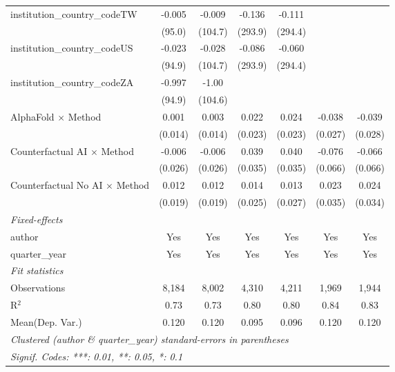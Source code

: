 \begin{tabular}{lcccccc}
   institution\_country\_codeTW          & -0.005        & -0.009        & -0.136        & -0.111        &               &   \\   
                                         & (95.0)        & (104.7)       & (293.9)       & (294.4)       &               &   \\   
   institution\_country\_codeUS          & -0.023        & -0.028        & -0.086        & -0.060        &               &   \\   
                                         & (94.9)        & (104.7)       & (293.9)       & (294.4)       &               &   \\   
   institution\_country\_codeZA          & -0.997        & -1.00         &               &               &               &   \\   
                                         & (94.9)        & (104.6)       &               &               &               &   \\   
   AlphaFold $\times$ Method             & 0.001         & 0.003         & 0.022         & 0.024         & -0.038        & -0.039\\   
                                         & (0.014)       & (0.014)       & (0.023)       & (0.023)       & (0.027)       & (0.028)\\   
   Counterfactual AI $\times$ Method     & -0.006        & -0.006        & 0.039         & 0.040         & -0.076        & -0.066\\   
                                         & (0.026)       & (0.026)       & (0.035)       & (0.035)       & (0.066)       & (0.066)\\   
   Counterfactual No AI $\times$ Method  & 0.012         & 0.012         & 0.014         & 0.013         & 0.023         & 0.024\\   
                                         & (0.019)       & (0.019)       & (0.025)       & (0.027)       & (0.035)       & (0.034)\\   
   \midrule
   \emph{Fixed-effects}\\
   author                                & Yes           & Yes           & Yes           & Yes           & Yes           & Yes\\  
   quarter\_year                         & Yes           & Yes           & Yes           & Yes           & Yes           & Yes\\  
   \midrule
   \emph{Fit statistics}\\
   Observations                          & 8,184         & 8,002         & 4,310         & 4,211         & 1,969         & 1,944\\  
   R$^2$                                 & 0.73          & 0.73          & 0.80          & 0.80          & 0.84          & 0.83\\  
Mean(Dep. Var.) & 0.120 & 0.120 & 0.095 & 0.096 & 0.120 & 0.120 \\
   \midrule \midrule
   \multicolumn{7}{l}{\emph{Clustered (author \& quarter\_year) standard-errors in parentheses}}\\
   \multicolumn{7}{l}{\emph{Signif. Codes: ***: 0.01, **: 0.05, *: 0.1}}\\
\end{tabular}
\par\endgroup
